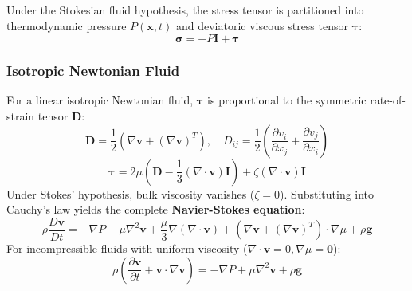 \documentclass[11pt,a4paper]{article}
\begin{document}
Under the Stokesian fluid hypothesis, the stress tensor is partitioned into thermodynamic pressure $P(\mathbf{x}, t)$ and deviatoric viscous stress tensor $\boldsymbol{\tau}$:
\begin{equation}
\boldsymbol{\sigma} = -P \mathbf{I} + \boldsymbol{\tau}
\end{equation}

\subsubsection{Isotropic Newtonian Fluid}
For a linear isotropic Newtonian fluid, $\boldsymbol{\tau}$ is proportional to the symmetric rate-of-strain tensor $\mathbf{D}$:
\begin{equation}
\mathbf{D} = \frac{1}{2} \left( \nabla \mathbf{v} + (\nabla \mathbf{v})^T \right), \quad D_{ij} = \frac{1}{2}\left( \frac{\partial v_i}{\partial x_j} + \frac{\partial v_j}{\partial x_i} \right)
\end{equation}
\begin{equation}
\boldsymbol{\tau} = 2\mu \left( \mathbf{D} - \frac{1}{3}(\nabla \cdot \mathbf{v})\mathbf{I} \right) + \zeta (\nabla \cdot \mathbf{v})\mathbf{I}
\end{equation}
Under Stokes' hypothesis, bulk viscosity vanishes ($\zeta = 0$). Substituting into Cauchy's law yields the complete \textbf{Navier-Stokes equation}:
\begin{equation}
\rho \frac{D\mathbf{v}}{Dt} = -\nabla P + \mu \nabla^2 \mathbf{v} + \frac{\mu}{3} \nabla (\nabla \cdot \mathbf{v}) + (\nabla \mathbf{v} + (\nabla \mathbf{v})^T) \cdot \nabla \mu + \rho \mathbf{g}
\end{equation}
For incompressible fluids with uniform viscosity ($\nabla \cdot \mathbf{v} = 0, \nabla \mu = \mathbf{0}$):
\begin{equation}
\rho \left( \frac{\partial \mathbf{v}}{\partial t} + \mathbf{v} \cdot \nabla \mathbf{v} \right) = -\nabla P + \mu \nabla^2 \mathbf{v} + \rho \mathbf{g}
\end{equation}
\end{document}

